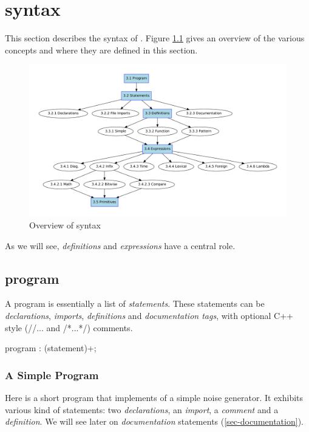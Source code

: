 \chapter{\faust syntax}
\label{syntax}


This section describes the syntax of \faust. Figure \ref{fig-syntax} gives an overview of the various concepts and where they are defined in this section. 
\begin{figure}[ht!]
\centering
\includegraphics[scale=0.45]{illustrations/syntax-chart}
\caption{Overview of \faust syntax}
\label{fig-syntax}
\end{figure}

As we will see, \textit{definitions} and \textit{expressions} have a central role.

\section{\faust program}

A \faust program is essentially a list of \textit{statements}. These statements can be \textit{declarations}, \textit{imports}, \textit{definitions} and \textit{documentation tags}, with optional C++ style (//... and /*...*/) comments.
 
\begin{rail}
program : (statement)+;
\end{rail}

\subsection{A Simple Program}

Here is a short \faust program that implements of a simple noise generator. It exhibits various kind of statements: two \textit{declarations}, an \textit{import}, a \textit{comment} and a \textit{definition}. We will see later on \textit{documentation} statements (\ref{sec-documentation}).

